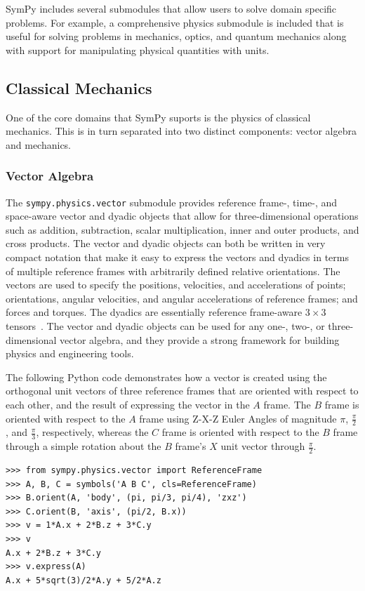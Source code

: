 SymPy includes several submodules that allow users to solve domain specific
problems. For example, a comprehensive physics submodule is included that is
useful for solving problems in mechanics, optics, and quantum
mechanics along with support for manipulating physical quantities with units.


\subsection{Classical Mechanics}
One of the core domains that SymPy suports is the physics of classical
mechanics. This is in turn separated into two distinct components:
vector algebra and mechanics.

\subsubsection{Vector Algebra}

The \verb|sympy.physics.vector| submodule provides reference frame-, time-,
and space-aware vector and dyadic objects that allow for three-dimensional
operations such as addition, subtraction, scalar multiplication, inner and
outer products, and cross products. The vector and dyadic objects can both be
written in very compact notation that make it easy to express the vectors and
dyadics in terms of multiple reference frames with arbitrarily defined
relative orientations. The vectors are used to specify the positions,
velocities, and accelerations of points; orientations, angular velocities, and
angular accelerations of reference frames; and forces and torques. The dyadics
are essentially reference frame-aware $3 \times 3$
tensors~\cite{tai1997generalized}. The vector and dyadic objects can be used
for any one-, two-, or three-dimensional vector algebra, and they provide a
strong framework for building physics and engineering tools.

The following Python code demonstrates how a vector is created using
the orthogonal unit vectors of three reference frames that are oriented with
respect to each other, and the result of expressing the vector in the $A$
frame. The $B$ frame is oriented with respect to the $A$ frame using Z-X-Z
Euler Angles of magnitude $\pi$, $\frac{\pi}{2}$, and
$\frac{\pi}{3}$, respectively, whereas the $C$ frame is oriented
with respect to the $B$ frame through a simple rotation about the $B$ frame's
$X$ unit vector through $\frac{\pi}{2}$.

\begin{verbatim}
>>> from sympy.physics.vector import ReferenceFrame
>>> A, B, C = symbols('A B C', cls=ReferenceFrame)
>>> B.orient(A, 'body', (pi, pi/3, pi/4), 'zxz')
>>> C.orient(B, 'axis', (pi/2, B.x))
>>> v = 1*A.x + 2*B.z + 3*C.y
>>> v
A.x + 2*B.z + 3*C.y
>>> v.express(A)
A.x + 5*sqrt(3)/2*A.y + 5/2*A.z
\end{verbatim}

